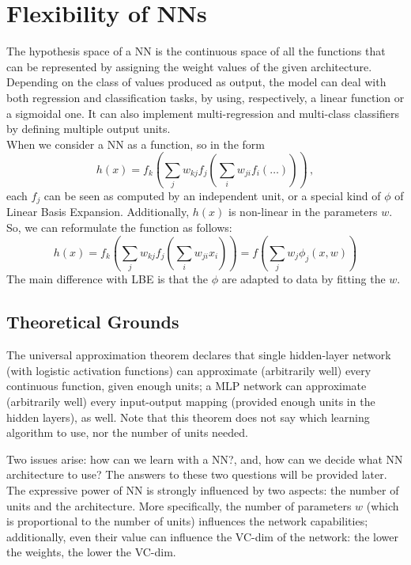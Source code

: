 \section{Flexibility of NNs}

The hypothesis space of a NN is the continuous space of all the functions that can be represented by assigning the weight values of the given architecture. Depending on the class of values produced as output, the model can deal with both regression and classification tasks, by using, respectively, a linear function or a sigmoidal one. It can also implement multi-regression and multi-class classifiers by defining multiple output units. \\
When we consider a NN as a function, so in the form
\begin{equation*}
    h(x) = f_k(\sum_j w_{kj} f_j (\sum_i w_{ji} f_i(\dots))) \, ,
\end{equation*}
each $f_j$ can be seen as computed by an independent unit, or a special kind of $\phi$ of Linear Basis Expansion. Additionally, $h(x)$ is non-linear in the parameters $w$. So, we can reformulate the function as follows:
\begin{equation*}
    h(x) = f_k(\sum_j w_{kj} f_j (\sum_i w_{ji} x_i)) = f(\sum_j w_j \phi_j(x,w))
\end{equation*}
The main difference with LBE is that the $\phi$ are adapted to data by fitting the $w$.

\subsection{Theoretical Grounds}

The universal approximation theorem declares that single hidden-layer network (with logistic activation functions) can approximate (arbitrarily well) every continuous function, given enough units; a MLP network can approximate (arbitrarily well) every input-output mapping (provided enough units in the hidden layers), as well. Note that this theorem does not say which learning algorithm to use, nor the number of units needed.

Two issues arise: how can we learn with a NN?, and, how can we decide what NN architecture to use? The answers to these two questions will be provided later. The expressive power of NN is strongly influenced by two aspects: the number of units and the architecture. More specifically, the number of parameters $w$ (which is proportional to the number of units) influences the network capabilities; additionally, even their value can influence the VC-dim of the network: the lower the weights, the lower the VC-dim.

